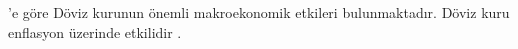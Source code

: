 \documentclass[pdf]{article}
\begin{document}
 
 \cite{yamak2005reel} 'e göre Döviz kurunun önemli makroekonomik etkileri bulunmaktadır. Döviz kuru enflasyon üzerinde etkilidir \citep{kara2012doviz}.
\newpage


\end{document}
